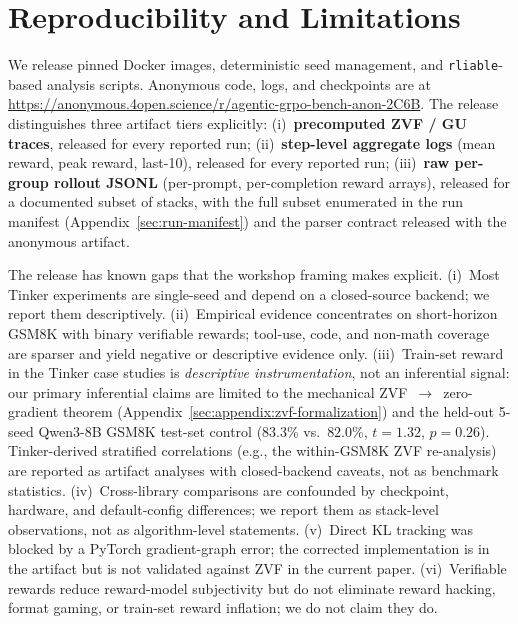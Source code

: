 \documentclass{article}
\begin{document}
\section{Reproducibility and Limitations}
\label{sec:limitations}

We release pinned Docker images, deterministic seed management, and
\texttt{rliable}-based analysis scripts. Anonymous code, logs, and
checkpoints are at
\url{https://anonymous.4open.science/r/agentic-grpo-bench-anon-2C6B}.
The release distinguishes three artifact tiers explicitly:
(i)~\textbf{precomputed ZVF / GU traces}, released for every reported run;
(ii)~\textbf{step-level aggregate logs} (mean reward, peak reward,
last-10), released for every reported run;
(iii)~\textbf{raw per-group rollout JSONL} (per-prompt, per-completion
reward arrays), released for a documented subset of stacks, with the full
subset enumerated in the run manifest (Appendix~\ref{sec:run-manifest})
and the parser contract released with the anonymous artifact.

The release has known gaps that the workshop framing makes explicit. (i)~Most
Tinker experiments are single-seed and depend on a closed-source backend; we
report them descriptively. (ii)~Empirical evidence concentrates on
short-horizon GSM8K with binary verifiable rewards; tool-use, code, and
non-math coverage are sparser and yield negative or descriptive evidence
only. (iii)~Train-set reward in the Tinker case studies is \emph{descriptive
instrumentation}, not an inferential signal: our primary inferential claims
are limited to the mechanical ZVF~$\to$~zero-gradient theorem
(Appendix~\ref{sec:appendix:zvf-formalization}) and the held-out 5-seed Qwen3-8B
GSM8K test-set control ($83.3\%$ vs.\ $82.0\%$, $t{=}1.32$, $p{=}0.26$).
Tinker-derived stratified correlations (e.g., the within-GSM8K ZVF
re-analysis) are reported as artifact analyses with closed-backend caveats,
not as benchmark statistics. (iv)~Cross-library comparisons are confounded by
checkpoint, hardware, and default-config differences; we report them as
stack-level observations, not as algorithm-level statements. (v)~Direct KL
tracking was blocked by a PyTorch gradient-graph error; the corrected
implementation is in the artifact but is not validated against ZVF in the
current paper. (vi)~Verifiable rewards reduce reward-model subjectivity but
do not eliminate reward hacking, format gaming, or train-set reward
inflation; we do not claim they do.
\end{document}

